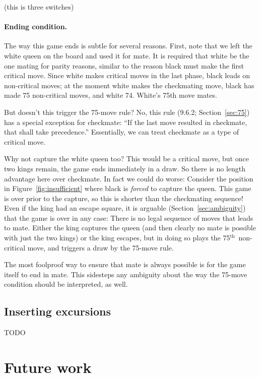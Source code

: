 \documentclass[twocolumn]{article}
\renewcommand\th{$^{\mathrm{th}}$}
\begin{document}
(this is three switches)

\paragraph{Ending condition.} The way this game ends is subtle for
several reasons. First, note that we left the white queen on the board
and used it for mate. It is required that white be the one mating for
parity reasons, similar to the reason black must make the first critical
move. Since white makes critical moves in the last phase, black leads
on non-critical moves; at the moment white makes the checkmating move,
black has made 75 non-critical moves, and white 74. White's 75th move
mates.

But doesn't this trigger the 75-move rule? No, this rule (9.6.2;
Section~\ref{sec:75}) has a special exception for checkmate: ``If the
last move resulted in checkmate, that shall take precedence.''
Essentially, we can treat checkmate as a type of critical move.

Why not capture the white queen too? This would be a critical move,
but once two kings remain, the game ends immediately in a draw. So
there is no length advantage here over checkmate. In fact we could do
worse: Consider the position in Figure~\ref{fig:insufficient} where
black is {\em forced} to capture the queen. This game is over prior to
the capture, so this is shorter than the checkmating sequence! Even if
the king had an escape square, it is arguable
(Section~\ref{sec:ambiguity}) that the game is over in any case: There
is no legal sequence of moves that leads to mate. Either the king
captures the queen (and then clearly no mate is possible with just the
two kings) or the king escapes, but in doing so plays the
75\th\ non-critical move, and triggers a draw by the 75-move rule.

The most foolproof way to ensure that mate is always possible is for the
game itself to end in mate. This sidesteps any ambiguity about the way
the 75-move condition should be interpreted, as well.


\subsection{Inserting excursions} \label{sec:excursions}

TODO

\section{Future work}
\end{document}
